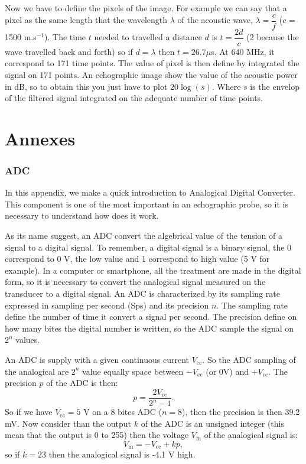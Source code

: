 \documentclass[a4paper,twoside,11pt]{article}
\begin{document}
Now we have to define the pixels of the image. For example we can say that a 
pixel as the same length that the wavelength $\lambda$ of the acoustic wave, 
$\lambda=\dfrac{c}{f}$ ($c$ = 1500 m.s$^{-1}$). The time $t$ needed to 
travelled a distance $d$ is $t=\dfrac{2d}{c}$ (2 because the wave travelled 
back and forth) so if $d = \lambda$ then $t = 26.7 \mu$s. At 640 MHz, it 
correspond to 171 time points. The value of pixel is then define by integrated 
the signal on 171 points. An echographic image show the value of the acoustic 
power in dB, so to obtain this you just have to plot $20\log\left(s\right)$. 
Where $s$ is the envelop of the filtered signal integrated on the adequate 
number of time points.

\clearpage
{}

\part*{Annexes}

\label{sec:Annexes}



\appendix

\section{ADC}
\label{sec:ADC}

In this appendix, we make a quick introduction to Analogical Digital Converter. 
This component is one of the most important in an echographic probe, so it is 
necessary to understand how does it work.

As its name suggest, an ADC convert the algebrical value of the tension of a 
signal to a digital signal. To remember, a digital signal is a binary signal, 
the 0 correspond to 0 V, the low value and 1 correspond to high 
value (5 V for example). In a computer or smartphone, all the treatment are 
made in the digital form, so it is necessary to convert the analogical signal 
measured on the transducer to a digital signal. An ADC is characterized by its 
sampling rate expressed in sampling per second (Sps) and its precision $n$. The 
sampling rate define the number of time it convert a signal per second. The 
precision define on how many bites the digital number is written, so the ADC 
sample the signal on $2^n$ values.

An ADC is supply with a given continuous current $V_{\text{cc}}$. So the ADC 
sampling of the analogical are $2^n$ value equally space between 
$-V_{\text{cc}}$ (or 0V) and $+V_{\text{cc}}$. The precision $p$ of the ADC is 
then:
\begin{equation}
 p=\dfrac{2V_{\text{cc}}}{2^n-1}.
 \label{eq:precision adc}
\end{equation}
So if we have $V_{\text{cc}}=5$ V on a 8 bites ADC ($n=8$), then the precision 
is then 39.2 mV. Now consider than the output $k$ of the ADC is an unsigned 
integer (this mean that the output is 0 to 255) then the voltage $V_{\text{m}}$ 
of the analogical signal is:
\begin{equation}
 V_{\text{m}}=-V_{\text{cc}}+kp,
 \label{eq:voltage value adc}
\end{equation}
so if $k=23$ then the analogical signal is -4.1 V high.
\end{document}
